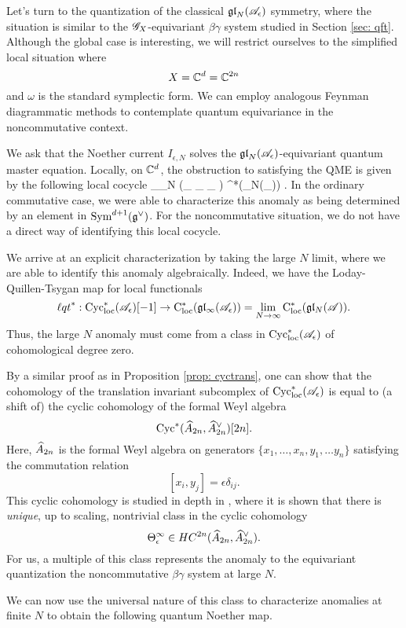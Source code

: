 Let's turn to the quantization of the classical $\fgl_N(\sA_\epsilon)$ symmetry, where the situation is similar to the $\sG_X$-equivariant $\beta\gamma$ system studied in Section \ref{sec: qft}.
Although the global case is interesting, we will restrict ourselves to the simplified local situation where 
\[
X = \CC^d = \CC^{2n}
\] 
and $\omega$ is the standard symplectic form. 
We can employ analogous Feynman diagrammatic methods to contemplate quantum equivariance in the noncommutative context.

We ask that the Noether current $I_{\epsilon,N}$ solves the $\fgl_N(\sA_{\epsilon})$-equivariant quantum master equation.
Locally, on $\CC^d$, the obstruction to satisfying the QME is given by the following local cocycle 
\beqn\label{noncommobs}
\int \Tr_{\fgl_N} (\alpha \star_{\epsilon} \partial \alpha \star_{\epsilon} \cdots \star_{\epsilon} \partial \alpha) \in \cloc^*(\fgl_N(\sA_\epsilon)) .
\eeqn
In the ordinary commutative case, we were able to characterize this anomaly as being determined by an element in $\Sym^{d+1}(\fg^\vee)$.
For the noncommutative situation, we do not have a direct way of identifying this local cocycle.

We arrive at an explicit characterization by taking the large $N$ limit, where we are able to identify this anomaly algebraically. 
Indeed, we have the Loday-Quillen-Tsygan map for local functionals
\[
\lqt^* : \Cycloc^*(\sA_\epsilon)[-1] \to \cloc^*(\gl_\infty(\sA_\epsilon)) = \lim_{N \to \infty} \cloc^*(\gl_N( \sA))  .
\]
Thus, the large $N$ anomaly must come from a class in $\Cycloc^*(\sA_\epsilon)$ of cohomological degree zero. 

By a similar proof as in Proposition \ref{prop: cyctrans}, one can show that the cohomology of the translation invariant subcomplex of $\Cycloc^*(\sA_\epsilon)$ is equal to (a shift of) the cyclic cohomology of the formal Weyl algebra
\[
\Cyc^*(\Hat{A}_{2n}, \Hat{A}_{2n}^\vee) [2n] .
\]
Here, $\Hat{A}_{2n}$ is the formal Weyl algebra on generators $\{x_1,\ldots, x_n, y_1,\ldots y_n\}$ satisfying the commutation relation
\[
[x_i, y_j] = \epsilon \delta_{ij} .
\] 
This cyclic cohomology is studied in depth in \cite{Willwacher}, where it is shown that there is {\em unique}, up to scaling, nontrivial class in the cyclic cohomology
\[
\Theta_{\epsilon}^\infty \in HC^{2n} (\Hat{A}_{2n}, \Hat{A}_{2n}^\vee) .
\]
For us, a multiple of this class represents the anomaly to the equivariant quantization the noncommutative $\beta\gamma$ system at large $N$. 

We can now use the universal nature of this class to characterize anomalies at finite $N$ to obtain the following quantum Noether map. 

